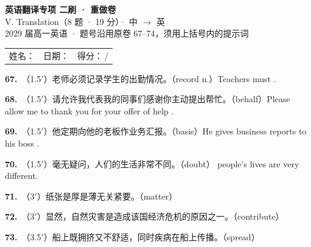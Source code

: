 \documentclass[10pt,a4paper]{article}
\newcommand{\blank}[1]{\underline{\hspace{#1}}}
\newcommand{\q}[3]{\noindent\textbf{#1.}~{\footnotesize（#2）}#3\par\vspace{0.5em}}
\newcommand{\wline}{\par\vspace{0.15em}\noindent\blank{16.6cm}\par}
\begin{document}
\pagestyle{plain}

\begin{center}
{\LARGE\bfseries 英语翻译专项 \quad 二刷 · 重做卷}\\[0.25em]
{\large V. Translation（8 题 · 19 分）· 中 $\to$ 英}\\[0.22em]
{\small 2029 届高一英语 · 题号沿用原卷 67--74，须用上括号内的提示词}
\end{center}

\vspace{0.3em}
\noindent\begin{tabular}{@{}p{}@{}p{}@{}p{}@{}}
姓名：\underline{\hspace{2.2cm}} & 日期：\underline{\hspace{2.2cm}} & 得分：\underline{\hspace{1.5cm}}\,/\enspace 19 \\
\end{tabular}

\vspace{0.35em}

\vspace{0.45em}
\q{67}{1.5$'$}{老师必须记录学生的出勤情况。（record n.）\newline\hspace{1.2em}Teachers must \blank{7.2cm}.}
\q{68}{1.5$'$}{请允许我代表我的同事们感谢你主动提出帮忙。（behalf）\newline\hspace{1.2em}Please allow me to thank you for your offer of help \blank{7.2cm}.}
\q{69}{1.5$'$}{他定期向他的老板作业务汇报。（basis）\newline\hspace{1.2em}He gives business reports to his boss \blank{6.4cm}.}
\q{70}{1.5$'$}{毫无疑问，人们的生活非常不同。（doubt）\newline\hspace{1.2em}\blank{4.2cm} people's lives are very different.}

\vspace{0.1em}
\q{71}{3$'$}{纸张是厚是薄无关紧要。（matter）}
\wline
\wline

\q{72}{3$'$}{显然，自然灾害是造成该国经济危机的原因之一。（contribute）}
\wline
\wline

\q{73}{3.5$'$}{船上既拥挤又不舒适，同时疾病在船上传播。（spread）}
\wline
\wline
\end{document}
